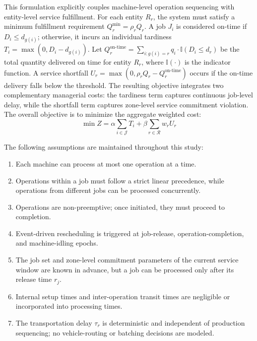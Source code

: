 \documentclass[a4paper,fleqn]{cas-sc}
\begin{document}
This formulation explicitly couples machine-level operation sequencing with entity-level service fulfillment. For each entity $R_r$, the system must satisfy a minimum fulfillment requirement $Q_r^{\min} = \rho_r Q_r$. A job $J_i$ is considered on-time if $D_i \le d_{g(i)}$; otherwise, it incurs an individual tardiness $T_i = \max(0, D_i - d_{g(i)})$. Let $Q_r^{\text{on-time}} = \sum_{i:g(i)=r} q_i \cdot \mathbb{I}(D_i \le d_r)$ be the total quantity delivered on time for entity $R_r$, where $\mathbb{I}(\cdot)$ is the indicator function. A service shortfall $U_r = \max(0, \rho_r Q_r - Q_r^{\text{on-time}})$ occurs if the on-time delivery falls below the threshold. The resulting objective integrates two complementary managerial costs: the tardiness term captures continuous job-level delay, while the shortfall term captures zone-level service commitment violation. The overall objective is to minimize the aggregate weighted cost:
\begin{equation}
    \min Z = \alpha \sum_{i \in \mathcal{J}} T_i + \beta \sum_{r \in \mathcal{R}} w_r U_r
\end{equation}

The following assumptions are maintained throughout this study:
\begin{enumerate}
    \item Each machine can process at most one operation at a time.
    \item Operations within a job must follow a strict linear precedence, while operations from different jobs can be processed concurrently.
    \item Operations are non-preemptive; once initiated, they must proceed to completion.
    \item Event-driven rescheduling is triggered at job-release, operation-completion, and machine-idling epochs.
    \item The job set and zone-level commitment parameters of the current service window are known in advance, but a job can be processed only after its release time $r_j$.
    \item Internal setup times and inter-operation transit times are negligible or incorporated into processing times.
    \item The transportation delay $\tau_r$ is deterministic and independent of production sequencing; no vehicle-routing or batching decisions are modeled.
\end{enumerate}
\end{document}
